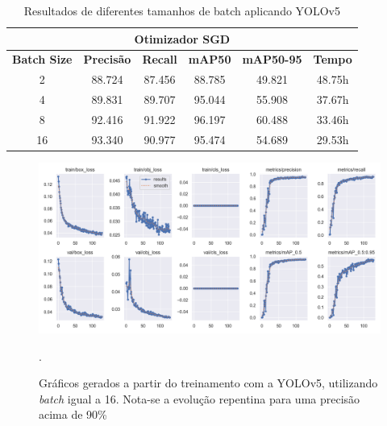 \begin{table}[!hbt]
    \centering
    \begin{tabular}{|c|c|c|c|c|c|}
    \hline
    \multicolumn{6}{|c|}{\textbf{Otimizador SGD}} \\ \hline
    \textbf{Batch Size} & \textbf{Precisão} & \textbf{Recall} & \textbf{mAP50} & \textbf{mAP50-95} & \textbf{Tempo} \\ \hline
    2                   & 88.724                & 87.456               & 88.785              & 49.821                 & 48.75h             \\ \hline
    4                   & 89.831                 & 89.707               & 95.044             & 55.908                & 37.67h             \\ \hline
    8                   & 92.416                 & 91.922               & 96.197              & 60.488                 & 33.46h             \\ \hline
    16                  & 93.340                 & 90.977               & 95.474              & 54.689                 & 29.53h             \\ \hline
    \end{tabular}
    \caption{Resultados de diferentes tamanhos de batch aplicando YOLOv5}
    \label{tab:yolov5-teste}
\end{table}

\begin{figure}[!h]
    \centering
    \begin{minipage}{1\linewidth}
    \centering
    \captionsetup{justification=centering,margin=0.5cm,font=small}
    \includegraphics[width=1\linewidth]{img/cap6/results-yolov5-batch-16.png}
    \caption{Gráficos gerados a partir do treinamento com a YOLOv5, utilizando \textit{batch} igual a 16. Nota-se a evolução repentina para uma precisão acima de 90\%}.
    \label{fig:yolov5batch16}
    \end{minipage}
\end{figure}


